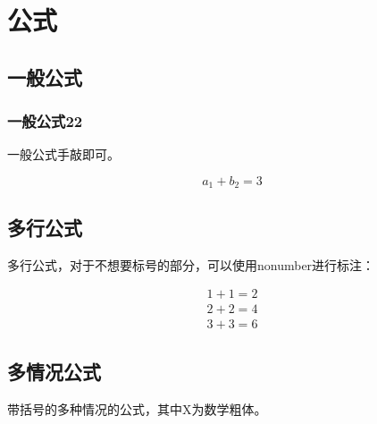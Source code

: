 \documentclass[AutoFakeBold]{LZUThesis}
\begin{document}
\section{公式}

\subsection{一般公式}
\subsubsection{一般公式22}

一般公式手敲即可。



\begin{equation}\label{eq:sip}
    a_1 + b_2 = 3
\end{equation}


\subsection{多行公式}

多行公式，对于不想要标号的部分，可以使用nonumber进行标注：


\begin{gather}\label{eq:add}
    1+1=2 \\
    2+2=4 \\
    3+3=6 \nonumber
\end{gather}

\subsection{多情况公式}
带括号的多种情况的公式，其中X为数学粗体。

\end{document}
